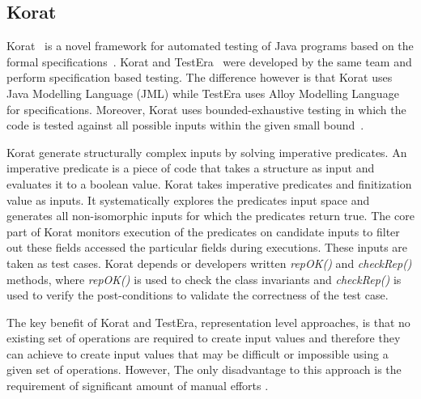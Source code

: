 
\subsection{Korat} %
Korat~\cite{Boyapati2002} is a novel framework for automated testing of Java programs based on the formal specifications~\cite{chang1999structural}. Korat and TestEra~\cite{Khurshid2004} were developed by the same team and perform specification based testing. The difference however is that Korat uses Java Modelling Language (JML) while TestEra uses Alloy Modelling Language for specifications. Moreover, Korat uses bounded-exhaustive testing in which the code is tested against all possible inputs within the given small bound~\cite{khurshid2001checking}.

Korat generate structurally complex inputs by solving imperative predicates. An imperative predicate is a piece of code that takes a structure as input and evaluates it to a boolean value. Korat takes imperative predicates and finitization value as inputs. It systematically explores the predicates input space and generates all non-isomorphic inputs for which the predicates return true. The core part of Korat monitors execution of the predicates on candidate inputs to filter out these fields accessed the particular fields during executions. These inputs are taken as test cases. Korat depends or developers written {\it repOK()} and {\it checkRep()} methods, where {\it repOK()} is used to check the class invariants and {\it checkRep()} is used to verify the post-conditions to validate the correctness of the test case. 

The key benefit of Korat and TestEra, representation level approaches, is that no existing set of operations are required to create input values and therefore they can achieve to create input values that may be difficult or impossible using a given set of operations. However, The only disadvantage to this approach is the requirement of significant amount of manual efforts \cite{pacheco2009directed}.    

